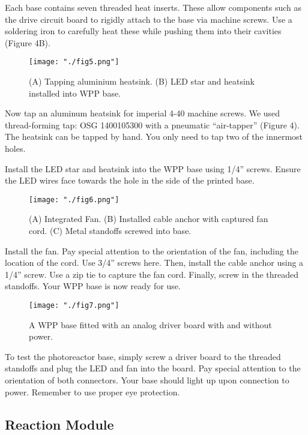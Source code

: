 \documentclass[11pt]{article}
\begin{document}
Each base contains seven threaded heat inserts.
These allow components such as the drive circuit board to rigidly attach to the base via machine screws.
Use a soldering iron to carefully heat these while pushing them into their cavities (Figure 4B).

\begin{figure}[H]
	\texttt{[image: "./fig5.png"]}
	\caption{(A) Tapping aluminium heatsink. (B) LED star and heatsink installed into WPP base.}
\end{figure}

Now tap an aluminum heatsink for imperial 4-40 machine screws.
We used thread-forming tap: OSG 1400105300 with a pneumatic ``air-tapper'' (Figure 4).
The heatsink can be tapped by hand.
You only need to tap two of the innermost holes.

Install the LED star and heatsink into the WPP base using 1/4'' screws.
Ensure the LED wires face towards the hole in the side of the printed base.

\begin{figure}[H]
	\texttt{[image: "./fig6.png"]}
	\caption{(A) Integrated Fan. (B) Installed cable anchor with captured fan cord. (C) Metal standoffs screwed into base.}
\end{figure}

Install the fan.
Pay special attention to the orientation of the fan, including the location of the cord.
Use 3/4'' screws here.
Then, install the cable anchor using a 1/4'' screw.
Use a zip tie to capture the fan cord.
Finally, screw in the threaded standoffs.
Your WPP base is now ready for use.

\begin{figure}[H]
	\texttt{[image: "./fig7.png"]}
	\caption{A WPP base fitted with an analog driver board with and without power.}
\end{figure}

To test the photoreactor base, simply screw a driver board to the threaded standoffs and plug the LED and fan into the board.
Pay special attention to the orientation of both connectors.
Your base should light up upon connection to power.
Remember to use proper eye protection.

\clearpage

\subsection{Reaction Module} \label{SEC:enclosure}
\end{document}
